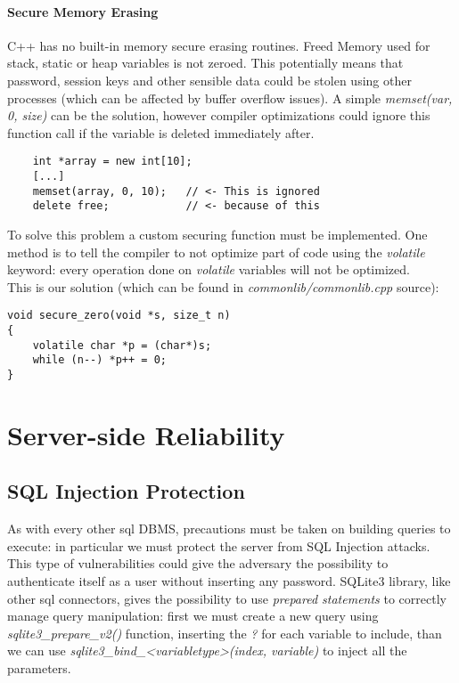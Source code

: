 \paragraph{Secure Memory Erasing}
C++ has no built-in memory secure erasing routines. Freed Memory used for stack, static or heap variables is not zeroed. This potentially means that password, session keys and other sensible data could be stolen using other processes (which can be affected by buffer overflow issues). A simple \textit{memset(var, 0, size)} can be the solution, however compiler optimizations could ignore this function call if the variable is deleted immediately after.
\begin{lstlisting}
	int *array = new int[10];
	[...]
	memset(array, 0, 10);	// <- This is ignored
	delete free; 			// <- because of this
\end{lstlisting}
To solve this problem a custom securing function must be implemented. One method is to tell the compiler to not optimize part of code using the \textit{volatile} keyword: every operation done on \textit{volatile} variables will not be optimized.
\\
This is our solution (which can be found in \textit{commonlib/commonlib.cpp} source):
\begin{lstlisting}
void secure_zero(void *s, size_t n)
{
	volatile char *p = (char*)s;
	while (n--) *p++ = 0;
}
\end{lstlisting}


\section{Server-side Reliability}
\subsection{SQL Injection Protection}
As with every other sql DBMS, precautions must be taken on building queries to execute: in particular we must protect the server from SQL Injection attacks. This type of vulnerabilities could give the adversary the possibility to authenticate itself as a user without inserting any password. SQLite3 library, like other sql connectors, gives the possibility to use \textit{prepared statements} to correctly manage query manipulation: first we must create a new query using \textit{sqlite3\_prepare\_v2()} function, inserting the \textit{?} for each variable to include, than we can use \textit{sqlite3\_bind\_<variabletype>(index, variable)} to inject all the parameters.

